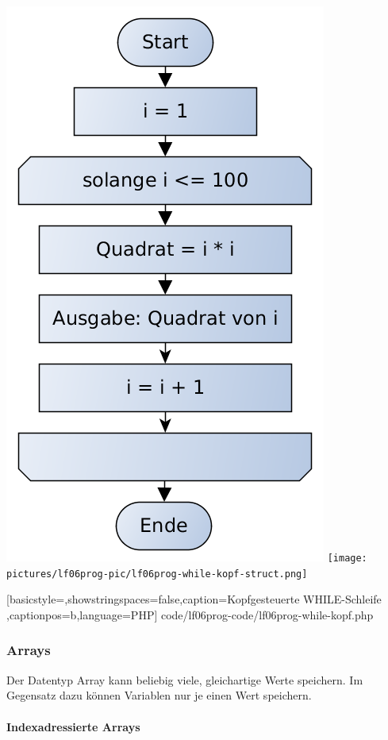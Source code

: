 \includegraphics[scale=0.4]{pictures/lf06prog-pic/lf06prog-while-kopf-pap.png}
\texttt{[image: pictures/lf06prog-pic/lf06prog-while-kopf-struct.png]}


	[basicstyle=\small,showstringspaces=false,caption={Kopfgesteuerte WHILE-Schleife}
	\label{lst:while-kopf},captionpos=b,language=PHP]
	{code/lf06prog-code/lf06prog-while-kopf.php}

\subsubsection{Arrays}

Der Datentyp Array kann beliebig viele, gleichartige Werte speichern. Im Gegensatz dazu können Variablen nur je einen Wert speichern. 

\paragraph{Indexadressierte Arrays}~\\

